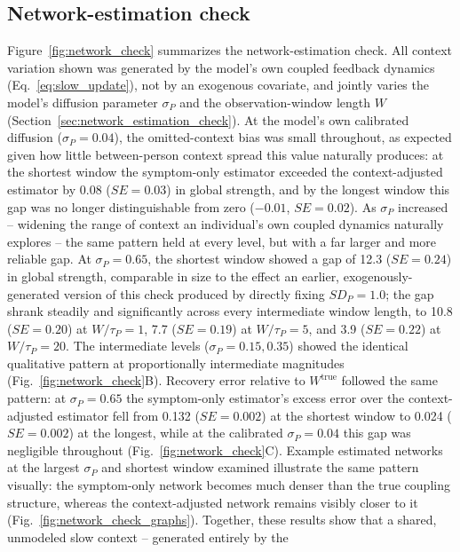 \documentclass[man,12pt,floatsintext]{apa7}
\begin{document}
\subsection{Network-estimation check}\label{sec:res_network_check}
Figure~\ref{fig:network_check} summarizes the network-estimation check. All context variation
shown was generated by the model's own coupled feedback dynamics (Eq.~\eqref{eq:slow_update}),
not by an exogenous covariate, and jointly varies the model's diffusion parameter \(\sigma_P\) and
the observation-window length \(W\) (Section~\ref{sec:network_estimation_check}).
At the model's own calibrated diffusion (\(\sigma_P=0.04\)), the omitted-context bias was small
throughout, as expected given how little between-person context spread this value naturally
produces: at the shortest window the symptom-only estimator exceeded the context-adjusted
estimator by 0.08 (\(SE=0.03\)) in global strength, and by the longest window this gap was no
longer distinguishable from zero (\(-0.01\), \(SE=0.02\)).
As \(\sigma_P\) increased -- widening the range of context an individual's own coupled dynamics
naturally explores -- the same pattern held at every level, but with a far larger and more
reliable gap. At \(\sigma_P=0.65\), the shortest window showed a gap of 12.3 (\(SE=0.24\)) in
global strength, comparable in size to the effect an earlier, exogenously-generated version of
this check produced by directly fixing \(SD_P=1.0\); the gap shrank steadily and significantly
across every intermediate window length, to 10.8 (\(SE=0.20\)) at \(W/\tau_P=1\), 7.7
(\(SE=0.19\)) at \(W/\tau_P=5\), and 3.9 (\(SE=0.22\)) at \(W/\tau_P=20\). The intermediate levels
(\(\sigma_P=0.15,0.35\)) showed the identical qualitative pattern at proportionally intermediate
magnitudes (Fig.~\ref{fig:network_check}B).
Recovery error relative to \(W^{\mathrm{true}}\) followed the same pattern: at \(\sigma_P=0.65\)
the symptom-only estimator's excess error over the context-adjusted estimator fell from 0.132
(\(SE=0.002\)) at the shortest window to 0.024 (\(SE=0.002\)) at the longest, while at the
calibrated \(\sigma_P=0.04\) this gap was negligible throughout (Fig.~\ref{fig:network_check}C).
Example estimated networks at the largest \(\sigma_P\) and shortest window examined illustrate the
same pattern visually: the symptom-only network becomes much denser than the true coupling
structure, whereas the context-adjusted network remains visibly closer to it
(Fig.~\ref{fig:network_check_graphs}).
Together, these results show that a shared, unmodeled slow context -- generated entirely by the
\end{document}
